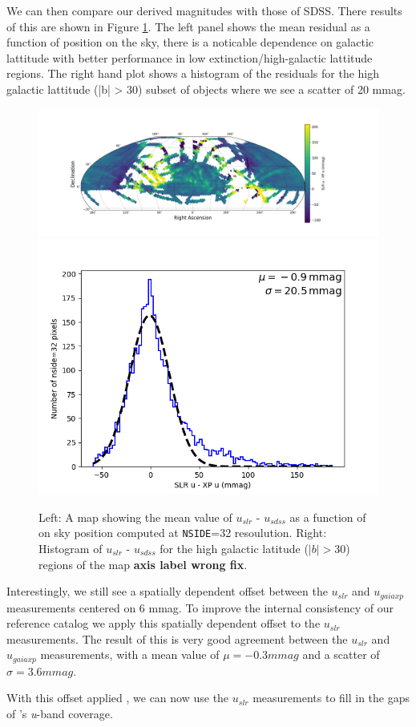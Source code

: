 We can then compare our derived magnitudes with those of SDSS. There results of this are shown in Figure \ref{fig:slr_sdss_compare}. The left panel shows the mean residual as a function of position on the sky, there is a noticable dependence on galactic lattitude with better performance in low extinction/high-galactic lattitude regions. The right hand plot shows a histogram of the residuals for the high galactic lattitude (|b| > 30) subset of objects where we see a scatter of 20 mmag.  
\begin{figure}
    \includegraphics[width=0.64\linewidth]{./figures/u-band/uslr/uslr-usdss_full_map.png}
    \includegraphics[width=0.32\linewidth]{./figures/u-band/uslr/uslr-usdss_highglat_hist.png}

    \label{fig:slr_sdss_compare}
    \caption{
    Left: A map showing the mean value of $u_{slr}$ - $u_{sdss}$ as a function of on sky position computed at \texttt{NSIDE}=32 resoulution.  
    Right: Histogram of $u_{slr}$ - $u_{sdss}$ for the high galactic latitude ($|b| > 30$) regions of the map \textbf{axis label wrong fix}. }
\end{figure}

Interestingly, we still see a spatially dependent offset between the $u_{slr}$ and $u_{gaiaxp}$ measurements centered on 6 mmag.
To improve the internal consistency of our reference catalog we apply this spatially dependent offset to the $u_{slr}$ measurements.
The result of this is very good agreement between the $u_{slr}$ and $u_{gaiaxp}$ measurements, with a mean value of $\mu = -0.3 mmag$ and a scatter of $\sigma = 3.6 mmag$. 

With this offset applied , we can now use the $u_{slr}$ measurements to fill in the gaps of \monster's \textit{u}-band coverage.

